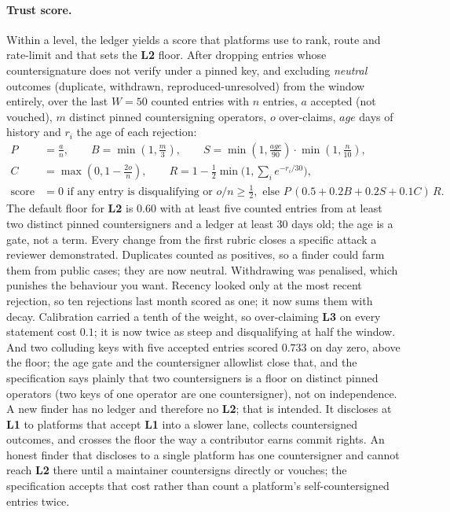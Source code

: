 \documentclass[11pt]{article}
\newcommand{\lvl}[1]{\textbf{L#1}}
\begin{document}
\paragraph{Trust score.} Within a level, the ledger yields a score that platforms use to rank, route and
rate-limit and that sets the \lvl{2} floor. After dropping entries whose countersignature does not verify under
a pinned key, and excluding \emph{neutral} outcomes (duplicate, withdrawn, reproduced-unresolved) from the
window entirely, over the last $W=50$ counted entries with $n$ entries,
$a$ accepted (not vouched), $m$ distinct pinned countersigning operators, $o$ over-claims, $age$ days of history and
$r_i$ the age of each rejection:
\begin{align*}
P &= \tfrac{a}{n}, \qquad B = \min(1, \tfrac{m}{3}), \qquad S = \min(1,\tfrac{age}{90})\cdot\min(1,\tfrac{n}{10}),\\
C &= \max(0, 1-\tfrac{2o}{n}), \qquad R = 1 - \tfrac{1}{2}\min\!\Big(1, \textstyle\sum_i e^{-r_i/30}\Big),\\
\text{score} &= 0 \text{ if any entry is disqualifying or } o/n \ge \tfrac12, \text{ else } P\,(0.5 + 0.2B + 0.2S + 0.1C)\,R.
\end{align*}
The default floor for \lvl{2} is $0.60$ with at least five counted entries from at least two distinct pinned
countersigners and a ledger at least 30 days old; the age is a gate, not a term. Every change from the first
rubric closes a specific attack a reviewer demonstrated. Duplicates counted as positives, so a finder could
farm them from public cases; they are now neutral. Withdrawing was penalised, which punishes the behaviour you
want. Recency looked only at the most recent rejection, so ten rejections last month scored as one; it now sums
them with decay. Calibration carried a tenth of the weight, so over-claiming \lvl{3} on every statement cost
$0.1$; it is now twice as steep and disqualifying at half the window. And two colluding keys with five
accepted entries scored $0.733$ on day zero, above the floor; the age gate and the countersigner allowlist
close that, and the specification says plainly that two countersigners is a floor on distinct pinned operators
(two keys of one operator are one countersigner), not on independence. A new finder has no ledger and therefore no \lvl{2}; that is intended. It discloses at \lvl{1} to
platforms that accept \lvl{1} into a slower lane, collects countersigned outcomes, and crosses the floor the way
a contributor earns commit rights. An honest finder that discloses to a single platform has one countersigner
and cannot reach \lvl{2} there until a maintainer countersigns directly or vouches; the specification accepts
that cost rather than count a platform's self-countersigned entries twice.
\end{document}
